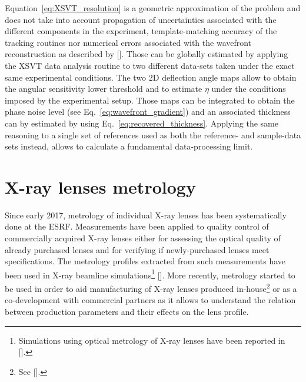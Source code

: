 \begin{refsection}
Equation~\ref{eq:XSVT_resolution} is a geometric approximation of the problem and does not take into account propagation of uncertainties associated with the different components in the experiment, template-matching accuracy of the tracking routines nor numerical errors associated with the wavefront reconstruction as described by [\cite{Fried1977, Southwell1980}]. Those can be globally estimated by applying the XSVT data analysis routine to two different data-sets taken under the exact same experimental conditions. The two 2D deflection angle maps allow to obtain the angular sensitivity lower threshold and to estimate $\eta$ under the conditions imposed by the experimental setup. Those maps can be integrated to obtain the phase noise level (see Eq.~\ref{eq:wavefront_gradient}) and an associated thickness can by estimated by using Eq.~\ref{eq:recovered_thickness}. Applying the same reasoning to a single set of references used as both the reference- and sample-data sets instead, allows to calculate a fundamental data-processing limit.


\section{X-ray lenses metrology}\label{sec:metrology}

Since early 2017, metrology of individual X-ray lenses has been systematically done at the ESRF. Measurements have been applied to quality control of commercially acquired X-ray lenses either for assessing the optical quality of already purchased lenses and for verifying if newly-purchased lenses meet specifications. The metrology profiles extracted from such measurements have been used in X-ray beamline simulations\footnote{Simulations using optical metrology of X-ray lenses have been reported in [\cite{Chubar2020}].} [\cite{Celestre2020}]. More recently, metrology started to be used in order to aid manufacturing of X-ray lenses produced in-house\footnote{See [\cite{Celestre2020c}].} or as a co-development with commercial partners as it allows to understand the relation between production parameters and their effects on the lens profile.


\end{refsection}
